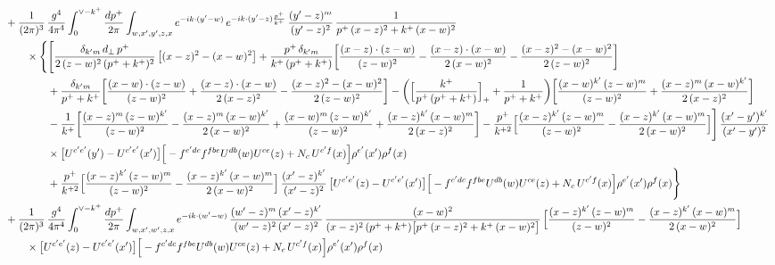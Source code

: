 \documentclass[10pt]{article}
\numberwithin{equation}{section}
\begin{document}
\begin{align}
&+\frac{1}{(2\pi)^{3}}\,\frac{g^{4}}{4\pi^{4}}\int_{0}^{\vee-k^{+}}\frac{dp^{+}}{2\pi}\int_{w,x^{\prime},y^{\prime},z,x}e^{-ik\cdot (y^{\prime}-w)}\,e^{-ik\cdot (y^{\prime}-z)\frac{p^{+}}{k^{+}}}\,\frac{(y^{\prime}-z)^{m}}{(y^{\prime}-z)^{2}}\,\frac{1}{p^{+}\,(x-z)^{2}+k^{+}\,(x-w)^{2}}\notag\\
&\qquad\times\Bigg\{\Bigg[\frac{\delta_{k^{\prime}m}\,d_{\perp}\,p^{+}}{2\,(z-w)^{2}\,(p^{+}+k^{+})^{2}}\left[(x-z)^{2}-(x-w)^{2}\right]+\frac{p^{+}\,\delta_{k^{\prime}m}}{k^{+}\,(p^{+}+k^{+})}\bigg[\frac{(x-z)\cdot(z-w)}{(z-w)^{2}}-\frac{(x-z)\cdot(x-w)}{2\,(x-w)^{2}}-\frac{(x-z)^{2}-(x-w)^{2}}{2\,(z-w)^{2}}\bigg]\notag\\
&\qquad\qquad+\frac{\delta_{k^{\prime}m}}{p^{+}+k^{+}}\bigg[\frac{(x-w)\cdot(z-w)}{(z-w)^{2}}+\frac{(x-z)\cdot(x-w)}{2\,(x-z)^{2}}-\frac{(x-z)^{2}-(x-w)^{2}}{2\,(z-w)^{2}}\bigg]
-\bigg(\Big[\frac{k^{+}}{p^{+}\,(p^{+}+k^{+})}\Big]_{+}+\frac{1}{p^{+}+k^{+}}\bigg)\bigg[\frac{(x-w)^{k^{\prime}}\,(z-w)^{m}}{(z-w)^{2}}+\frac{(x-z)^{m}\,(x-w)^{k^{\prime}}}{2\,(x-z)^{2}}\bigg]\notag\\
&\qquad\qquad-\frac{1}{k^{+}}\bigg[\frac{(x-z)^{m}\,(z-w)^{k^{\prime}}}{(z-w)^{2}}-\frac{(x-z)^{m}\,(x-w)^{k^{\prime}}}{2\,(x-w)^{2}}+\frac{(x-w)^{m}\,(z-w)^{k^{\prime}}}{(z-w)^{2}}+\frac{(x-z)^{k^{\prime}}\,(x-w)^{m}}{2\,(x-z)^{2}}\bigg]
-\frac{p^{+}}{k^{+2}}\Big[\frac{(x-z)^{k^{\prime}}\,(z-w)^{m}}{(z-w)^{2}}-\frac{(x-z)^{k^{\prime}}\,(x-w)^{m}}{2\,(x-w)^{2}}\Big]\Bigg]\,\frac{(x^{\prime}-y^{\prime})^{k^{\prime}}}{(x^{\prime}-y^{\prime})^{2}}\notag\\
&\qquad\qquad\times\big[U^{c^{\prime}e^{\prime}}(y^{\prime})-U^{c^{\prime}e^{\prime}}(x^{\prime})\big]\Big[-f^{c^{\prime}dc}f^{fbe}U^{db}(w)U^{ce}(z)+N_{c}\,U^{c^{\prime}f}(x)\Big]\rho^{e^{\prime}}(x^{\prime})\rho^{f}(x)\notag\\
&\qquad\qquad+\frac{p^{+}}{k^{+2}}\Big[\frac{(x-z)^{k^{\prime}}\,(z-w)^{m}}{(z-w)^{2}}-\frac{(x-z)^{k^{\prime}}\,(x-w)^{m}}{2\,(x-w)^{2}}\Big]\,\frac{(x^{\prime}-z)^{k^{\prime}}}{(x^{\prime}-z)^{2}}\,\big[U^{c^{\prime}e^{\prime}}(z)-U^{c^{\prime}e^{\prime}}(x^{\prime})\big]\Big[-f^{c^{\prime}dc}f^{fbe}U^{db}(w)U^{ce}(z)+N_{c}\,U^{c^{\prime}f}(x)\Big]\rho^{e^{\prime}}(x^{\prime})\rho^{f}(x)\Bigg\}\notag\\
&+\frac{1}{(2\pi)^{3}}\,\frac{g^{4}}{4\pi^{4}}\int_{0}^{\vee-k^{+}}\frac{dp^{+}}{2\pi}\int_{w,x^{\prime},w^{\prime},z,x}e^{-ik\cdot (w^{\prime}-w)}\,\frac{(w^{\prime}-z)^{m}\,(x^{\prime}-z)^{k^{\prime}}}{(w^{\prime}-z)^{2}\,(x^{\prime}-z)^{2}}\,\frac{(x-w)^{2}}{(x-z)^{2}\,(p^{+}+k^{+})\big[p^{+}\,(x-z)^{2}+k^{+}\,(x-w)^{2}\big]}\,\Big[\frac{(x-z)^{k^{\prime}}\,(z-w)^{m}}{(z-w)^{2}}-\frac{(x-z)^{k^{\prime}}\,(x-w)^{m}}{2\,(x-w)^{2}}\Big]\notag\\&\qquad\times\big[U^{c^{\prime}e^{\prime}}(z)-U^{c^{\prime}e^{\prime}}(x^{\prime})\big]\Big[-f^{c^{\prime}dc}f^{fbe}U^{db}(w)U^{ce}(z)+N_{c}\,U^{c^{\prime}f}(x)\Big]\rho^{e^{\prime}}(x^{\prime})\rho^{f}(x)\notag\\[6pt]

\end{align}
\end{document}

